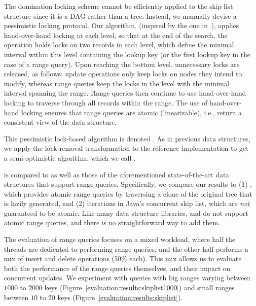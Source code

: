 The domination locking scheme cannot be efficiently applied to the skip list
structure since it is a DAG rather than a tree. Instead, we
manually devise a pessimistic locking protocol. Our
algorithm, (inspired by the one in~\cite{HerlihyS2008}), applies
hand-over-hand locking at each level, so that at the end of the search, the
operation holds locks on two records in each level, which define the minimal interval within this level
containing the lookup key (or the first lookup key in the case of a range query). Upon
reaching the bottom level, unnecessary locks are released, as follows: update operations only keep
locks on nodes they intend to modify, whereas
range
queries keep the locks in the level with the minimal interval spanning the
range. Range queries then continue to use hand-over-hand locking to traverse through all records
within the range. The use of hand-over-hand locking ensures that range queries are atomic
(linearizable), i.e., return a consistent view of the data structure.

This pessimistic lock-based algorithm is denoted \domSkiplist.
As in previous data structures, we  apply the lock-removal transformation to the
reference implementation to get a semi-optimistic algorithm, which we call
\autoSkiplist.

\autoSkiplist is compared to \domSkiplist as well as those of the aforementioned
state-of-the-art data structures that support range queries. Specifically,
we compare our results to (1)
\bronson, which provides atomic range queries by traversing a clone of the
original tree that is lazily generated, and (2)
iterations in Java's concurrent skip list, which are \emph{not}
guaranteed to be atomic. Like many data structure libraries, \friendly and \danaAVL
do not support atomic range queries, and
there is no straightforward way to add them.

The evaluation of range queries focuses on a mixed workload, where half the
threads are dedicated to performing range queries, and the other half performs a
mix of insert and delete operations (50\% each).
This mix allows us to evaluate both the performance of the range queries themselves,
and their impact on concurrent updates.
We experiment with queries with big ranges varying between $1000$ to $2000$ keys
(Figure~\ref{evaluation:results:skiplist1000}) and small ranges
between $10$ to $20$
keys (Figure~\ref{evaluation:results:skiplist}).


